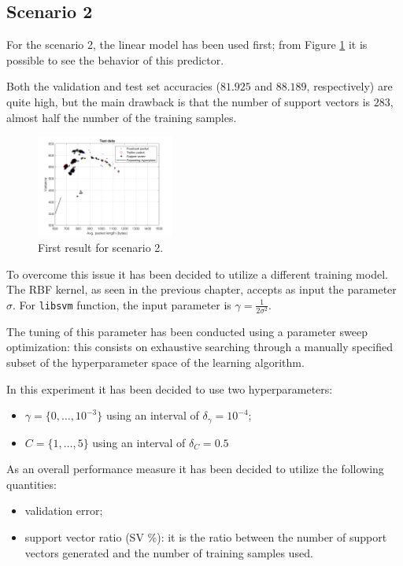\documentclass[a4paper, 11pt]{article}
\begin{document}
\subsection*{Scenario 2}
For the scenario 2, the linear model has been used first; from Figure \ref{fig:s2_linear_vector} it is possible to see the behavior of this predictor. 

Both the validation and test set accuracies ($81.925$ and $88.189$, respectively) are quite high, but the main drawback is that the number of support vectors is $283$, almost half the number of the training samples.

\begin{figure}[H]
	\centering
	\includegraphics[width=0.4\textwidth]{s2_linear_vector}
	\caption{First result for scenario 2.}
	\label{fig:s2_linear_vector}
\end{figure}

To overcome this issue it has been decided to utilize a different training model. The RBF kernel, as seen in the previous chapter, accepts as input the parameter $\sigma$. For \texttt{libsvm} function, the input parameter is $\gamma = \frac{1}{2\sigma^2}$.

The tuning of this parameter has been conducted using a parameter sweep optimization: this consists on exhaustive searching through a manually specified subset of the hyperparameter space of the learning algorithm.

In this experiment it has been decided to use two hyperparameters:
\begin{itemize}
    \item $\gamma = \{0, \dots, 10^{-3} \}$ using an interval of $\delta_{\gamma}=10^{-4}$;
    \item $C = \{1, \dots, 5 \}$ using an interval of $\delta_{C}=0.5$
\end{itemize}
As an overall performance measure it has been decided to utilize the following quantities:
\begin{itemize}
	\item validation error;
	\item support vector ratio (SV \%): it is the ratio between the number of support vectors generated and the number of training samples used.
\end{itemize}
\end{document}
